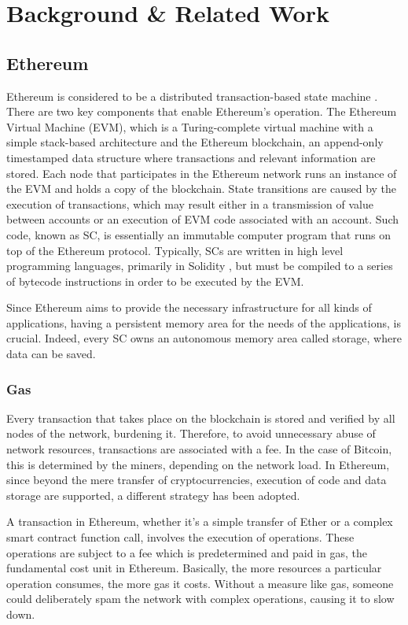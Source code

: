 \chapter{Background \& Related Work}\label{chapter:background}

\section{Ethereum}\label{sec:ethereum}
Ethereum is considered to be a distributed transaction-based state machine  \citep{wood_2014}. There are two key components that enable Ethereum’s operation. The Ethereum Virtual Machine (EVM), which is a Turing-complete virtual machine with a simple stack-based architecture and the Ethereum blockchain, an append-only timestamped data structure where transactions and relevant information are stored. Each node that participates in the Ethereum network runs an instance of the EVM and holds a copy of the blockchain. State transitions are caused by the execution of transactions, which may result either in a transmission of value between accounts or an execution of EVM code associated with an account. Such code, known as SC, is essentially an immutable computer program that runs on top of the Ethereum protocol. Typically, SCs are written in high level programming languages, primarily in Solidity  \citep{solidity}, but must be compiled to a series of bytecode instructions in order to be executed by the EVM.

Since Ethereum aims to provide the necessary infrastructure for all kinds of applications, having a persistent memory area for the needs of the applications, is crucial. Indeed, every SC owns an autonomous memory area called storage, where data can be saved.

\subsection{Gas}\label{sec:gas}
Every transaction that takes place on the blockchain is stored and verified by all nodes of the network, burdening it. Therefore, to avoid unnecessary abuse of network resources, transactions are associated with a fee. In the case of Bitcoin, this is determined by the miners, depending on the network load. In Ethereum, since beyond the mere transfer of cryptocurrencies, execution of code and data storage are supported, a different strategy has been adopted.

A transaction in Ethereum, whether it's a simple transfer of Ether or a complex smart contract function call, involves the execution of operations. These operations are subject to a fee which is predetermined  \citep{wood_2014} and paid in gas, the fundamental cost unit in Ethereum. Basically, the more resources a particular operation consumes, the more gas it costs. Without a measure like gas, someone could deliberately spam the network with complex operations, causing it to slow down.

